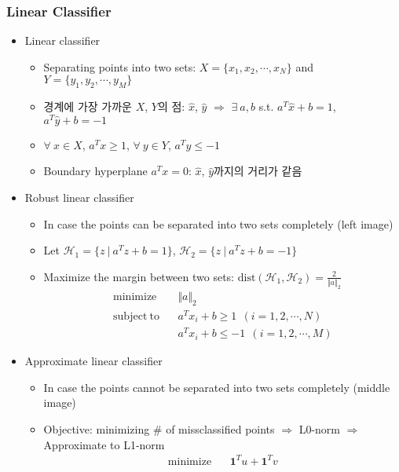\subsubsection*{Linear Classifier}
\begin{itemize}
    \item Linear classifier
    \begin{itemize}
        \item Separating points into two sets: $X=\{x_1,x_2,\cdots,x_N\}$ and $Y=\{y_1,y_2,\cdots,y_M\}$
        \item 경계에 가장 가까운 $X$, $Y$의 점: $\hat{x}$, $\hat{y}$ $\Rightarrow$ $\exists~a,b$ s.t. $a^T\hat{x}+b=1$, $a^T\hat{y}+b=-1$
        \item $\forall~x\in X$, $a^Tx\geq1$, $\forall~y\in Y$, $a^Ty\leq-1$
        \item Boundary hyperplane $a^Tx=0$: $\hat{x}$, $\hat{y}$까지의 거리가 같음
    \end{itemize}
    \newpage
    \item Robust linear classifier
    \begin{itemize}
        \item In case the points can be separated into two sets completely (left image)
        \item Let $\mathcal{H}_1=\{z~|~a^Tz+b=1\}$, $\mathcal{H}_2=\{z~|~a^Tz+b=-1\}$
        \item Maximize the margin between two sets: $\mathrm{dist}(\mathcal{H}_1,\mathcal{H}_2)=\frac{2}{\Vert a\Vert_2}$
            $$ \begin{aligned}
                \mathrm{minimize}~~&~~\Vert a\Vert_2 \\
                \mathrm{subject~to}~~&~~a^Tx_i+b\geq1~~(i=1,2,\cdots,N) \\
                    &~~a^Tx_i+b\leq-1~~(i=1,2,\cdots,M)
            \end{aligned} $$
    \end{itemize}
    \item Approximate linear classifier
    \begin{itemize}
        \item In case the points cannot be separated into two sets completely (middle image)
        \item Objective: minimizing \# of missclassified points $\Rightarrow$ L0-norm $\Rightarrow$ Approximate to L1-norm
            $$ \begin{aligned}
                \mathrm{minimize}~~&~~\mathbf{1}^Tu+\mathbf{1}^Tv \\

\end{aligned}$$
\end{itemize}
\end{itemize}
